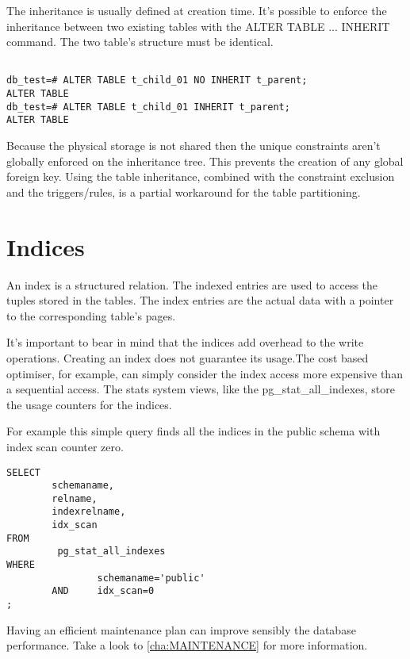 The inheritance is usually defined at creation time. It's possible to enforce the inheritance
between two existing tables with the ALTER TABLE ... INHERIT command. The two table's structure
must be identical.

\begin{lstlisting}[style=pgsql]

db_test=# ALTER TABLE t_child_01 NO INHERIT t_parent;
ALTER TABLE
db_test=# ALTER TABLE t_child_01 INHERIT t_parent;
ALTER TABLE

\end{lstlisting}

Because the physical storage is not shared then the unique constraints aren't globally enforced on
the inheritance tree. This prevents the creation of any global foreign key. Using the table
inheritance, combined with the constraint exclusion and the triggers/rules, is a partial workaround
for the table partitioning.

\section{Indices}
An index is a structured relation. The indexed entries are used to access the tuples stored in the
tables. The index entries are the actual data with a pointer to the corresponding table's pages.\newline

It's important to bear in mind that the indices add overhead to the write operations. Creating an index
does not guarantee its usage.The cost based optimiser, for example, can simply consider the index access
more expensive than a sequential access. The stats system views, like the pg\_stat\_all\_indexes,
store the usage counters for the indices.\newline

For example this simple query finds all the indices in the public schema with index scan counter zero.

\begin{lstlisting}[style=pgsql]
SELECT
        schemaname,
        relname,
        indexrelname,
        idx_scan
FROM
         pg_stat_all_indexes
WHERE
                schemaname='public'
        AND     idx_scan=0
;

\end{lstlisting}

Having an efficient maintenance plan can improve sensibly the database performance. Take a look to 
\ref{cha:MAINTENANCE} for more information.

